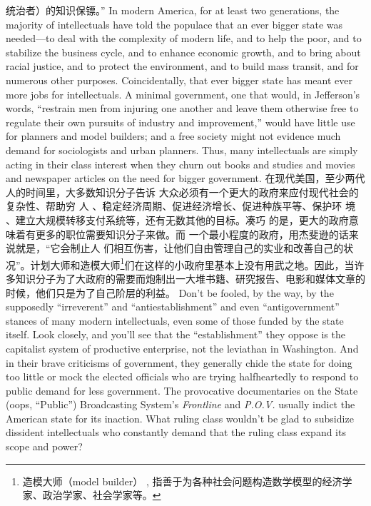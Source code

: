 \begin{paracol}{2}
统治者）的知识保镖。”
\switchcolumn*
In modern America, for at least two generations, the majority of intellectuals have told the populace that an ever bigger
state was needed---to deal with the complexity of modern life,
and to help the poor, and to stabilize the business cycle, and to
enhance economic growth, and to bring about racial justice,
and to protect the environment, and to build mass transit, and
for numerous other purposes. Coincidentally, that ever bigger
state has meant ever more jobs for intellectuals. A minimal
government, one that would, in Jefferson's words, ``restrain
men from injuring one another {and} leave them otherwise free
to regulate their own pursuits of industry and improvement,''
would have little use for planners and model builders; and a
free society might not evidence much demand for sociologists
and urban planners. Thus, many intellectuals are simply acting
in their class interest when they churn out books and studies
and movies and newspaper articles on the need for bigger government.
\switchcolumn
在现代美国，至少两代人的时间里，大多数知识分子告诉
大众必须有一个更大的政府来应付现代社会的复杂性、帮助穷
人 、稳定经济周期、促进经济增长、促进种族平等、保护环
境 、建立大规模转移支付系统等，还有无数其他的目标。凑巧
的是，更大的政府意味着有更多的职位需要知识分子来做。而
一个最小程度的政府，用杰斐逊的话来说就是，“它会制止人
们相互伤害，让他们自由管理自己的实业和改善自己的状
况”。计划大师和造模大师\footnote{造模大师（model builder） , 指善于为各种社会问题构造数学模型的经济学家、政治学家、社会学家等。}们在这样的小政府里基本上没有用武之地。因此，当许多知识分子为了大政府的需要而炮制出一大堆书籍、研究报告、电影和媒体文章的时候，他们只是为了自己阶层的利益。
\switchcolumn*
Don't be fooled, by the way, by the supposedly ``irreverent''
and ``antiestablishment'' and even ``antigovernment'' stances of
many modern intellectuals, even some of those funded by the
state itself. Look closely, and you'll see that the ``establishment''
they oppose is the capitalist system of productive enterprise,
not the leviathan in Washington. And in their brave criticisms
of government, they generally chide the state for doing too little or mock the elected officials who are trying halfheartedly to
respond to public demand for less government. The provocative
documentaries on the State (oops, ``Public'') Broadcasting System's \textit{Frontline} and \textit{P.O.V.} usually indict the American state for
its inaction. What ruling class wouldn't be glad to subsidize dissident intellectuals who constantly demand that the ruling
class expand its scope and power?
\switchcolumn

\end{paracol}
